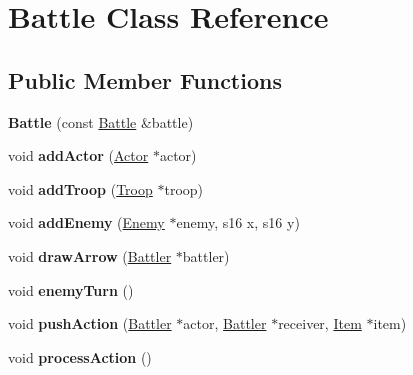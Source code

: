 \hypertarget{classBattle}{\section{Battle Class Reference}
\label{classBattle}
}
\subsection*{Public Member Functions}
\begin{DoxyCompactItemize}
\item 
\hypertarget{classBattle_a81daf6510851cfa958fe31eed732df8d}{{\bfseries Battle} (const \hyperlink{classBattle}{Battle} \&battle)}\label{classBattle_a81daf6510851cfa958fe31eed732df8d}

\item 
\hypertarget{classBattle_a04a4559e884edb5e10d78f4fc002a214}{void {\bfseries add\-Actor} (\hyperlink{classActor}{Actor} $\ast$actor)}\label{classBattle_a04a4559e884edb5e10d78f4fc002a214}

\item 
\hypertarget{classBattle_adb81ba8d0686cf26f7f8e367b9f62501}{void {\bfseries add\-Troop} (\hyperlink{classTroop}{Troop} $\ast$troop)}\label{classBattle_adb81ba8d0686cf26f7f8e367b9f62501}

\item 
\hypertarget{classBattle_a8475a0892e63c2c5882e64a33f92e2ad}{void {\bfseries add\-Enemy} (\hyperlink{classEnemy}{Enemy} $\ast$enemy, s16 x, s16 y)}\label{classBattle_a8475a0892e63c2c5882e64a33f92e2ad}

\item 
\hypertarget{classBattle_a8d3bbc992eb15e85a3b7de2b4cc34cf7}{void {\bfseries draw\-Arrow} (\hyperlink{classBattler}{Battler} $\ast$battler)}\label{classBattle_a8d3bbc992eb15e85a3b7de2b4cc34cf7}

\item 
\hypertarget{classBattle_ac1a5e1a8c51f1de78f371c764f5b4f47}{void {\bfseries enemy\-Turn} ()}\label{classBattle_ac1a5e1a8c51f1de78f371c764f5b4f47}

\item 
\hypertarget{classBattle_a9630440de6cf1087bc8e3fa3f723996c}{void {\bfseries push\-Action} (\hyperlink{classBattler}{Battler} $\ast$actor, \hyperlink{classBattler}{Battler} $\ast$receiver, \hyperlink{classItem}{Item} $\ast$item)}\label{classBattle_a9630440de6cf1087bc8e3fa3f723996c}

\item 
\hypertarget{classBattle_a24d3d1baf830e9bece9618176b426dd2}{void {\bfseries process\-Action} ()}\label{classBattle_a24d3d1baf830e9bece9618176b426dd2}


\end{DoxyCompactItemize}
